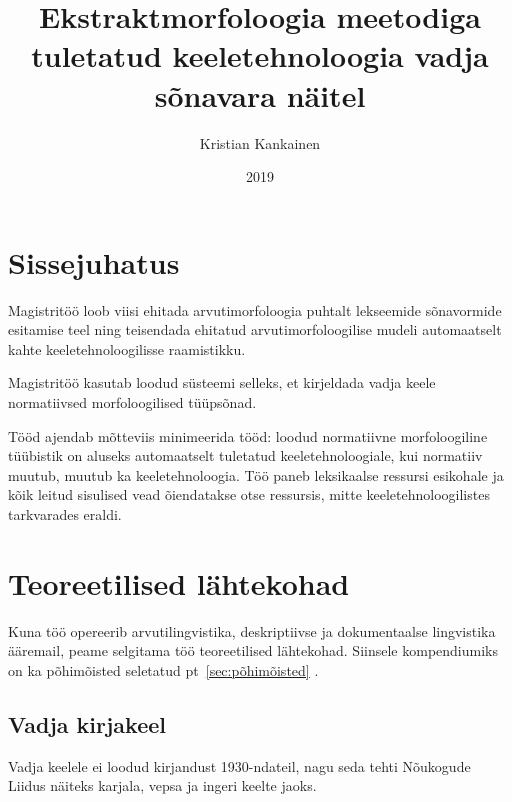 \documentclass[12pt,a4paper]{article}
\begin{document}
\title{Ekstraktmorfoloogia meetodiga tuletatud keeletehnoloogia vadja sõnavara näitel}
\author{Kristian Kankainen}
\date{2019}
\maketitle


\newpage
\tableofcontents



\newpage
{}
\section{Sissejuhatus}

Magistritöö loob viisi ehitada arvutimorfoloogia puhtalt lekseemide sõnavormide esitamise teel ning teisendada ehitatud arvutimorfoloogilise mudeli automaatselt kahte keeletehnoloogilisse raamistikku.

Magistritöö kasutab loodud süsteemi selleks, et kirjeldada vadja keele normatiivsed morfoloogilised tüüpsõnad.

Tööd ajendab mõtteviis minimeerida tööd: loodud normatiivne morfoloogiline tüübistik on aluseks automaatselt tuletatud keeletehnoloogiale, kui normatiiv muutub, muutub ka keeletehnoloogia. Töö paneb leksikaalse ressursi esikohale ja kõik leitud sisulised vead õiendatakse otse ressursis, mitte keeletehnoloogilistes tarkvarades eraldi.




\newpage
\section{Teoreetilised lähtekohad}
Kuna töö opereerib arvutilingvistika, deskriptiivse ja dokumentaalse lingvistika ääremail, peame selgitama töö teoreetilised lähtekohad. Siinsele kompendiumiks on ka põhimõisted seletatud pt~\ref{sec:põhimõisted} .


\subsection{Vadja kirjakeel}
\label{sec:kirjakeel}

Vadja keelele ei loodud kirjandust 1930-ndateil, nagu seda tehti Nõukogude Liidus näiteks karjala, vepsa ja ingeri keelte jaoks. 
\end{document}
